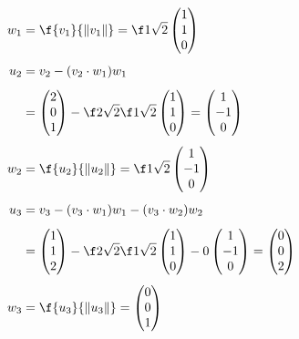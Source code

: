 \documentclass[a4paper]{article}
\begin{document}
\begin{align*}
w_1 &= \f{v_1}{\| v_1 \|} = \f1{\sqrt 2} \begin{pmatrix}1\\ 1\\ 0\end{pmatrix}\\[1ex]
u_2 &= v_2 - (v_2 \cdot w_1) w_1\\[1ex]
&= \begin{pmatrix}2\\ 0\\ 1\end{pmatrix} - \f2{\sqrt2} \f1{\sqrt2} \begin{pmatrix}1\\ 1\\ 0\end{pmatrix} = \begin{pmatrix}1\\ -1\\ 0\end{pmatrix}\\[1ex]
w_2 &= \f{u_2}{\| u_2 \|} = \f1{\sqrt2} \begin{pmatrix}1\\ -1\\ 0\end{pmatrix}\\[1ex]
u_3 &= v_3 - (v_3 \cdot w_1) w_1 - (v_3 \cdot w_2) w_2\\[1ex]
&= \begin{pmatrix}1\\ 1\\ 2\end{pmatrix} - \f2{\sqrt2} \f1{\sqrt2} \begin{pmatrix}1\\ 1\\ 0\end{pmatrix} - 0 \begin{pmatrix}1\\ -1\\ 0\end{pmatrix} = \begin{pmatrix}0\\ 0\\ 2\end{pmatrix}\\[1ex]
w_3 &= \f{u_3}{\| u_3 \|} = \begin{pmatrix}0\\ 0\\ 1\end{pmatrix}
\end{align*}
\end{document}
